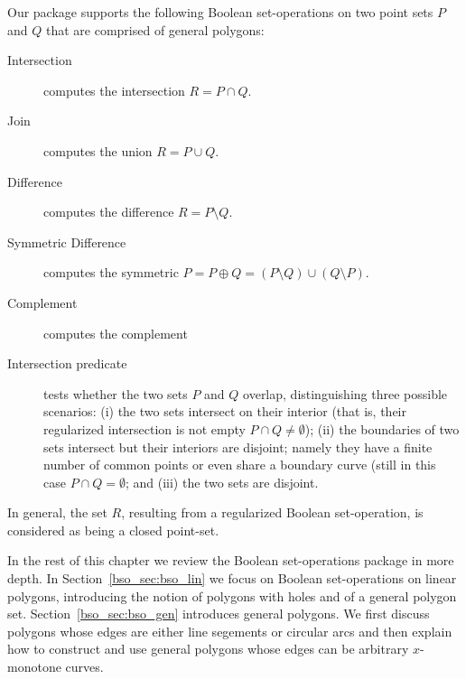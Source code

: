 Our package supports the following Boolean set-operations on two point
sets $P$ and $Q$ that are comprised of general polygons:
\begin{description}
\item[Intersection] computes the intersection $R = P \cap Q$.
\item[Join] computes the union $R = P \cup Q$.
\item [Difference] computes the difference $R = P \setminus Q$.
\item [Symmetric Difference] computes the symmetric
   $P = P \oplus Q = (P \setminus Q) \cup (Q \setminus P)$.
\item[Complement] computes the complement
\item [Intersection predicate] tests whether the two sets $P$ and $Q$
  overlap, distinguishing three possible scenarios: (i) the two sets
  intersect on their interior (that is, their regularized intersection
  is not empty $P \cap Q \neq \emptyset$); (ii) the boundaries of two
  sets intersect but their interiors are disjoint; namely they have a
  finite number of common points or even share a boundary curve (still
  in this case $P \cap Q = \emptyset$; and (iii) the two sets are
  disjoint.
\end{description}
In general, the set $R$, resulting from a regularized Boolean
set-operation, is considered as being a closed point-set.

In the rest of this chapter we review the Boolean set-operations package
in more depth. In Section~\ref{bso_sec:bso_lin} we focus on Boolean 
set-operations on linear polygons, introducing the notion of polygons with 
holes and of a general polygon set. Section~\ref{bso_sec:bso_gen}
introduces general polygons.
We first discuss polygons whose edges are either line segements or circular
arcs and then explain how to construct and use general polygons whose edges
can be arbitrary $x$-monotone curves.
